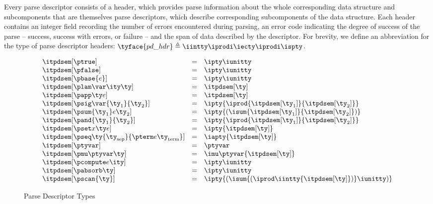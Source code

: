 Every parse descriptor consists of a header, which provides parse
information about the whole corresponding data structure and
subcomponents that are themselves parse descriptors, which describe
corresponding subcomponents of the data structure. Each header
contains an integer field recording the number of errors encountered
during parsing, an error code indicating the degree of success of the
parse -- success, success with errors, or failure -- and the span of
data described by the descriptor.  For brevity, we define an
abbreviation for the type of parse descriptor headers:
$\tyface{pd\_hdr} \triangleq \iintty \iprodi \iecty \iprodi \ispty$.

\begin{figure}
\fbox{$\itpdsem[\ty] = \ity$}
\[ 
\begin{array}{lcl} 

\itpdsem[\ptrue] & = & \ipty \iunitty \\                                                  
\itpdsem[\pfalse] & = & \ipty \iunitty \\                                                  
\itpdsem[\pbase{e}] & = & \ipty \iunitty\\
\itpdsem[\plam \var \ity \ty] & = & \itpdsem[\ty] \\
\itpdsem[\papp \ty e] & = & \itpdsem[\ty] \\
\itpdsem[\psig \var {\ty_1} {\ty_2}] & = & 
               \ipty {\iprod {\itpdsem[\ty_1]} {\itpdsem[\ty_2]}} \\
\itpdsem[\psum {\ty_1} e {\ty_2}] & = & 
               \ipty {(\isum {\itpdsem[\ty_1]} {\itpdsem[\ty_2]})} \\
\itpdsem[\pand {\ty_1} {\ty_2}] & = & \ipty {\iprod {\itpdsem[\ty_1]} {\itpdsem[\ty_2]}}    \\
\itpdsem[\pset x \ty e] & = & \ipty {\itpdsem[\ty]} \\
\itpdsem[\pseq \ty {\ty_{\text{sep}}} {\pterm e {\ty_{\text{term}}}}] & = & 
  \iapty {\itpdsem[\ty]} \\
\itpdsem[\ptyvar] & = & \ptyvar \\
\itpdsem[\pmu \ptyvar \ty] & = & \imu \ptyvar {\itpdsem[\ty]} \\
\itpdsem[\pcompute e \ity]            & = & \ipty \iunitty \\
\itpdsem[\pabsorb \ty]                & = & \ipty \iunitty \\
\itpdsem[\pscan{\ty}] & = & \ipty {(\isum {(\iprod \iintty
    {\itpdsem[\ty]})} \iunitty)}
\end{array}
\]
\label{fig:pd-tys}
\caption{Parse Descriptor Types}
\end{figure}

